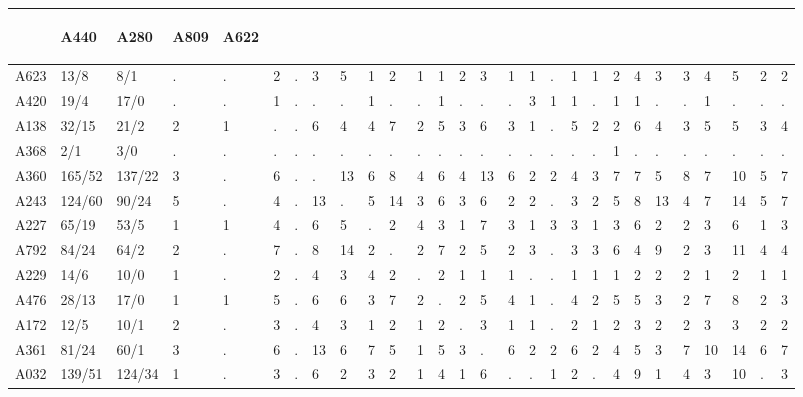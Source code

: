 \documentclass[a4paper, 11]{article}\usepackage[]{graphicx}\usepackage[]{color}
\begin{document}
\begin{table}
\begin{tabular}{rlllllllllllllllllllllllllll}
\end{sideways} & \begin{sideways} A440 \end{sideways} & \begin{sideways} A280 \end{sideways} & \begin{sideways} A809 \end{sideways} & \begin{sideways} A622 \end{sideways} \\ 
  \hline
A623 & 13/8 & 8/1 & . & . & 2 & . & 3 & 5 & 1 & 2 & 1 & 1 & 2 & 3 & 1 & 1 & . & 1 & 1 & 2 & 4 & 3 & 3 & 4 & 5 & 2 & 2 \\ 
  A420 & 19/4 & 17/0 & . & . & 1 & . & . & . & 1 & . & . & 1 & . & . & . & 3 & 1 & 1 & . & 1 & 1 & . & . & 1 & . & . & . \\ 
  A138 & 32/15 & 21/2 & 2 & 1 & . & . & 6 & 4 & 4 & 7 & 2 & 5 & 3 & 6 & 3 & 1 & . & 5 & 2 & 2 & 6 & 4 & 3 & 5 & 5 & 3 & 4 \\ 
  A368 & 2/1 & 3/0 & . & . & . & . & . & . & . & . & . & . & . & . & . & . & . & . & . & 1 & . & . & . & . & . & . & . \\ 
  A360 & 165/52 & 137/22 & 3 & . & 6 & . & . & 13 & 6 & 8 & 4 & 6 & 4 & 13 & 6 & 2 & 2 & 4 & 3 & 7 & 7 & 5 & 8 & 7 & 10 & 5 & 7 \\ 
  A243 & 124/60 & 90/24 & 5 & . & 4 & . & 13 & . & 5 & 14 & 3 & 6 & 3 & 6 & 2 & 2 & . & 3 & 2 & 5 & 8 & 13 & 4 & 7 & 14 & 5 & 7 \\ 
  A227 & 65/19 & 53/5 & 1 & 1 & 4 & . & 6 & 5 & . & 2 & 4 & 3 & 1 & 7 & 3 & 1 & 3 & 3 & 1 & 3 & 6 & 2 & 2 & 3 & 6 & 1 & 3 \\ 
  A792 & 84/24 & 64/2 & 2 & . & 7 & . & 8 & 14 & 2 & . & 2 & 7 & 2 & 5 & 2 & 3 & . & 3 & 3 & 6 & 4 & 9 & 2 & 3 & 11 & 4 & 4 \\ 
  A229 & 14/6 & 10/0 & 1 & . & 2 & . & 4 & 3 & 4 & 2 & . & 2 & 1 & 1 & 1 & . & . & 1 & 1 & 1 & 2 & 2 & 2 & 1 & 2 & 1 & 1 \\ 
  A476 & 28/13 & 17/0 & 1 & 1 & 5 & . & 6 & 6 & 3 & 7 & 2 & . & 2 & 5 & 4 & 1 & . & 4 & 2 & 5 & 5 & 3 & 2 & 7 & 8 & 2 & 3 \\ 
  A172 & 12/5 & 10/1 & 2 & . & 3 & . & 4 & 3 & 1 & 2 & 1 & 2 & . & 3 & 1 & 1 & . & 2 & 1 & 2 & 3 & 2 & 2 & 3 & 3 & 2 & 2 \\ 
  A361 & 81/24 & 60/1 & 3 & . & 6 & . & 13 & 6 & 7 & 5 & 1 & 5 & 3 & . & 6 & 2 & 2 & 6 & 2 & 4 & 5 & 3 & 7 & 10 & 14 & 6 & 7 \\ 
  A032 & 139/51 & 124/34 & 1 & . & 3 & . & 6 & 2 & 3 & 2 & 1 & 4 & 1 & 6 & . & . & 1 & 2 & . & 4 & 9 & 1 & 4 & 3 & 10 & . & 3 \\ 

\end{tabular}
\end{table}
\end{document}
